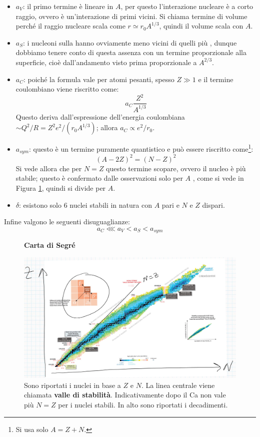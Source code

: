 \begin{itemize}
    \item $a_V$: il primo termine è lineare in $A$, per questo l'interazione nucleare è a corto raggio, ovvero è un'interazione di primi vicini. Si chiama termine di volume perché il raggio nucleare scala come $r\simeq r_0 A^{1/3}$, quindi il volume scala con $A$.
    \item $a_S$: i nucleoni sulla  hanno ovviamente meno vicini di quelli più , dunque dobbiamo tenere conto di questa assenza con un termine proporzionale alla superficie, cioè dall'andamento visto prima proporzionale a $A^{2/3}$.
    \item $a_C$: poiché la formula vale per atomi pesanti, spesso $Z\gg 1$ e il termine coulombiano viene riscritto come:
    $$a_C \frac{Z^2}{A^{1/3}}$$
    Questo deriva dall'espressione dell'energia coulombiana $\sim Q^2/R = Z^2 e^2 / (r_0A^{1/3})$; allora $a_C \propto e^2/r_0$.
    \item $a_{sym}$: questo è un termine puramente quantistico e può essere riscritto come\footnote{Si usa solo $A=Z+N$.}:
    $$(A-2Z)^2 = (N-Z)^2$$
    Si vede allora che per $N=Z$ questo termine scopare, ovvero il nucleo è più stabile; questo è confermato dalle osservazioni solo per $A$ , come si vede in Figura \ref{segre}, quindi si divide per $A$.
    \item $\delta$: esistono solo 6 nuclei stabili in natura con $A$ pari e $N$ e $Z$ dispari.
\end{itemize}
\noindent Infine valgono le seguenti disuguaglianze:
$$a_C \lll a_V <a_S < a_{sym}$$

\begin{figure}[h]
    \centering
    \textbf{\Large Carta di Segré}\par\medskip
    \includegraphics[scale=0.21]{Immagini/Segre.png}
    \caption{Sono riportati i nuclei in base a $Z$ e $N$. La linea centrale viene chiamata \textbf{valle di stabilità}. Indicativamente dopo il Ca non vale più $N=Z$ per i nuclei stabili. In alto sono riportati i decadimenti.}
    \label{segre}
\end{figure}
\newpage

